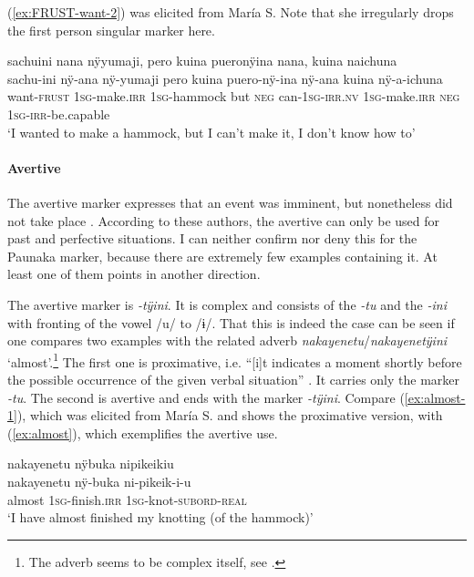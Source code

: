 (\ref{ex:FRUST-want-2}) was elicited from María S. Note that she irregularly drops the first person singular marker here.

\ea\label{ex:FRUST-want-2}
\begingl
\glpreamble sachuini nana nÿyumaji, pero kuina pueronÿina nana, kuina naichuna\\
\gla sachu-ini nÿ-ana nÿ-yumaji pero kuina puero-nÿ-ina nÿ-ana kuina nÿ-a-ichuna\\
\glb want-\textsc{frust} 1\textsc{sg}-make.\textsc{irr} 1\textsc{sg}-hammock but \textsc{neg} can-1\textsc{sg}-\textsc{irr.nv} 1\textsc{sg}-make.\textsc{irr} \textsc{neg} 1\textsc{sg}-\textsc{irr}-be.capable\\
\glft ‘I wanted to make a hammock, but I can’t make it, I don’t know how to’
\endgl
\trailingcitation{[rxx-e181031l-1]}
\xe
{}

\paragraph{Avertive}\label{sec:FRUST-Avertive}

The avertive marker expresses that an event was imminent, but nonetheless did not take place \citep[859]{Kuteva2019}. According to these authors, the avertive can only be used for past and perfective situations. I can neither confirm nor deny this for the Paunaka marker, because there are extremely few examples containing it. At least one of them points in another direction.

The avertive marker is \textit{-tÿini}. It is complex and consists of the  \textit{-tu} and the  \textit{-ini} with fronting of the vowel /u/ to /ɨ/. That this is indeed the case can be seen if one compares two examples with the related adverb \textit{nakayenetu}/\textit{nakayenetÿini} ‘almost’.\footnote{The adverb seems to be complex itself, see .} The first one is proximative, i.e. “[i]t indicates a moment shortly before the possible occurrence of the given verbal situation” \citep[859]{Kuteva2019}. It carries only the  marker \textit{-tu}. The second is avertive and ends with the marker \textit{-tÿini}. Compare (\ref{ex:almost-1}), which was elicited from María S. and shows the proximative version, with (\ref{ex:almost}), which exemplifies the avertive use.

\ea\label{ex:almost-1}
\begingl
\glpreamble nakayenetu nÿbuka nipikeikiu\\
\gla nakayenetu nÿ-buka ni-pikeik-i-u\\
\glb almost 1\textsc{sg}-finish.\textsc{irr} 1\textsc{sg}-knot-\textsc{subord}-\textsc{real}\\
\glft ‘I have almost finished my knotting (of the hammock)’
\endgl
\trailingcitation{[rxx-e181022le]}
\xe

